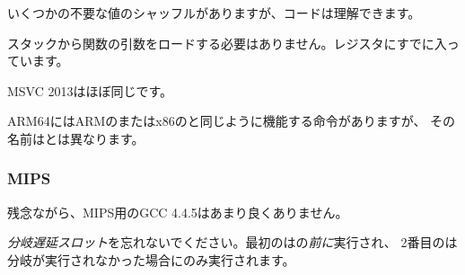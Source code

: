

いくつかの不要な値のシャッフルがありますが、コードは理解できます。




スタックから関数の引数をロードする必要はありません。レジスタにすでに入っています。



MSVC 2013はほぼ同じです。


ARM64にはARMのまたはx86のと同じように機能する命令がありますが、
その名前はとは異なります。



\subsubsection{MIPS}

残念ながら、MIPS用のGCC 4.4.5はあまり良くありません。



\emph{分岐遅延スロット}を忘れないでください。最初のはの\emph{前に}実行され、
2番目のは分岐が実行されなかった場合にのみ実行されます。

